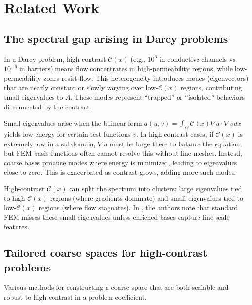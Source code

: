 \chapter{Related Work}\label{ch:literature}\newpage
\section{The spectral gap arising in Darcy problems}\label{sec:spectral_gap_darcy}
In a Darcy problem, high-contrast $ \mathcal{C}(x) $ (e.g., $ 10^6 $ in conductive channels vs.\ $ 10^{-6} $ in barriers) means flow concentrates in high-permeability regions, while low-permeability zones resist flow. This heterogeneity introduces modes (eigenvectors) that are nearly constant or slowly varying over low-$ \mathcal{C}(x) $ regions, contributing small eigenvalues to $ A $. These modes represent ``trapped'' or ``isolated'' behaviors disconnected by the contrast.

Small eigenvalues arise when the bilinear form $ a(u, v) = \int_{\Omega} \mathcal{C}(x) \nabla u \cdot \nabla v \, dx $ yields low energy for certain test functions $ v $. In high-contrast cases, if $ \mathcal{C}(x) $ is extremely low in a subdomain, $ \nabla u $ must be large there to balance the equation, but FEM basis functions often cannot resolve this without fine meshes. Instead, coarse bases produce modes where energy is minimized, leading to eigenvalues close to zero. This is exacerbated as contrast grows, adding more such modes.

High-contrast $ \mathcal{C}(x) $ can split the spectrum into clusters: large eigenvalues tied to high-$ \mathcal{C}(x) $ regions (where gradients dominate) and small eigenvalues tied to low-$ \mathcal{C}(x) $ regions (where flow stagnates). In \cite{msfem_for_darcy_Efendiev2011}, the authors note that standard FEM misses these small eigenvalues unless enriched bases capture fine-scale features.

\section{Tailored coarse spaces for high-contrast problems}\label{sec:tailored_coarse_spaces}
Various methods for constructing a coarse space that are both scalable and robust to high contrast in a problem coefficient.

